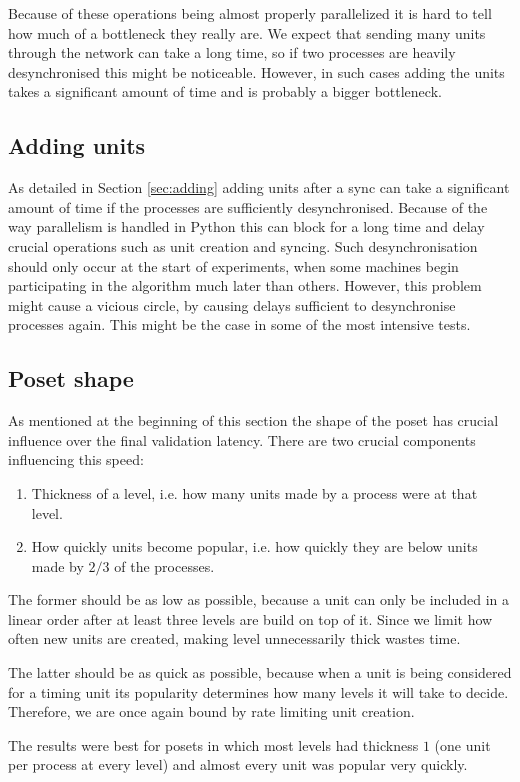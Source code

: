 \documentclass[a4paper,10pt]{article}
\begin{document}
			Because of these operations being almost properly parallelized it is hard to tell how much of a bottleneck they really are.
			We expect that sending many units through the network can take a long time, so if two processes are heavily desynchronised this might be noticeable.
			However, in such cases adding the units takes a significant amount of time and is probably a bigger bottleneck.
		\subsection{Adding units}
			As detailed in Section \ref{sec:adding} adding units after a sync can take a significant amount of time if the processes are sufficiently desynchronised.
			Because of the way parallelism is handled in Python this can block for a long time and delay crucial operations such as unit creation and syncing.
			Such desynchronisation should only occur at the start of experiments, when some machines begin participating in the algorithm much later than others.
			However, this problem might cause a vicious circle, by causing delays sufficient to desynchronise processes again.
			This might be the case in some of the most intensive tests.
		\subsection{Poset shape}
			As mentioned at the beginning of this section the shape of the poset has crucial influence over the final validation latency.
			There are two crucial components influencing this speed:
			\begin{enumerate}
				\item Thickness of a level, i.e. how many units made by a process were at that level.
				\item How quickly units become popular, i.e. how quickly they are below units made by $2/3$ of the processes.
			\end{enumerate}
			The former should be as low as possible, because a unit can only be included in a linear order after at least three levels are build on top of it.
			Since we limit how often new units are created, making level unnecessarily thick wastes time.

			The latter should be as quick as possible, because when a unit is being considered for a timing unit its popularity determines how many levels it will take to decide.
		 Therefore, we are once again bound by rate limiting unit creation.

			The results were best for posets in which most levels had thickness $1$ (one unit per process at every level) and almost every unit was popular very quickly.
\end{document}

